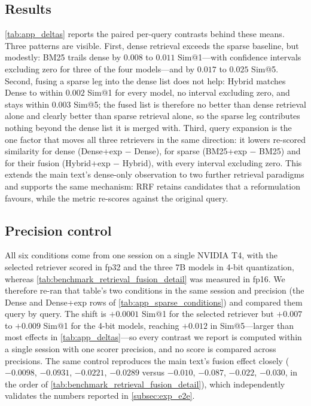 \documentclass[11pt]{article}
\begin{document}
\subsection{Results}
\cref{tab:app_deltas} reports the paired per-query contrasts behind these means. Three patterns are
visible. First, dense retrieval exceeds the sparse baseline, but modestly: BM25 trails dense by
\(0.008\) to \(0.011\) Sim@1---with confidence intervals excluding zero for three of the four
models---and by \(0.017\) to \(0.025\) Sim@5. Second, fusing a sparse leg into the dense list
does not help: Hybrid matches Dense to within \(0.002\) Sim@1 for every model, no interval
excluding zero, and stays within \(0.003\) Sim@5; the fused list is therefore no better than
dense retrieval alone and clearly better than sparse retrieval alone, so the sparse leg contributes
nothing beyond the dense list it is merged with. Third, query expansion is the one factor that moves
all three retrievers in the same direction: it lowers re-scored similarity for dense
(Dense+exp $-$ Dense), for sparse (BM25+exp $-$ BM25) and for their fusion
(Hybrid+exp $-$ Hybrid), with every interval excluding zero. This extends the main text's
dense-only observation to two further retrieval paradigms and supports the same mechanism: RRF
retains candidates that a reformulation favours, while the metric re-scores against the original
query.

\subsection{Precision control}
All six conditions come from one session on a single NVIDIA T4, with the selected retriever scored
in fp32 and the three 7B models in 4-bit quantization, whereas
\cref{tab:benchmark_retrieval_fusion_detail} was measured in fp16. We therefore re-ran that table's
two conditions in the same session and precision (the Dense and Dense+exp rows of
\cref{tab:app_sparse_conditions}) and compared them query by query. The shift is \(+0.0001\)
Sim@1 for the selected retriever but \(+0.007\) to \(+0.009\) Sim@1 for the 4-bit models,
reaching \(+0.012\) in Sim@5---larger than most effects in \cref{tab:app_deltas}---so every
contrast we report is computed within a single session with one scorer precision, and no score is
compared across precisions. The same control reproduces the main text's fusion effect closely
(\(-0.0098\), \(-0.0931\), \(-0.0221\), \(-0.0289\) versus \(-0.010\), \(-0.087\),
\(-0.022\), \(-0.030\), in the order of \cref{tab:benchmark_retrieval_fusion_detail}), which
independently validates the numbers reported in \cref{subsec:exp_e2e}.
\end{document}
